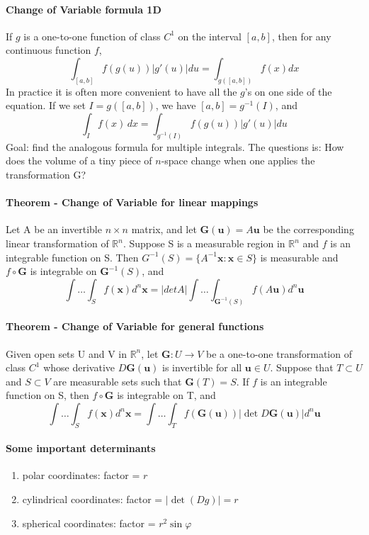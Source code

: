 \documentclass[11pt]{article}
\newcommand{\tb}[1]{\textbf{#1}}
\newcommand{\real}[0]{\mathbb{R}}
\newcommand{\func}[3]{\tb{#1}: {#2} \rightarrow {#3} }
\newcommand{\vx}[0]{\tb{x}}
\begin{document}
\paragraph{Change of Variable formula 1D} If $g$ is a one-to-one function of class $C^1$ on the interval $[a, b]$, then for any continuous function $f$,
$$\int_{[a,b]} f(g(u))|g'(u)|du = \int_{g([a,b])}f(x)dx$$
In practice it is often more convenient to have all the $g$'s on one side of the equation. If we set $I = g([a, b])$, we have $[a, b] = g^{-1}(I)$, and
$$\int_I f(x) \, dx = \int_{g^{-1}(I)}f(g(u))|g'(u)|du$$
Goal: find the analogous formula for multiple integrals. The questions is: How does the volume of a tiny piece of $n$-space change when one applies the transformation G?
\paragraph{Theorem - Change of Variable for linear mappings} Let A be an invertible $n \times n$ matrix, and let $\tb{G}(\tb{u}) = A\tb{u}$ be the corresponding linear transformation of $\real^n$. Suppose S is a measurable region in $\real^n$ and $f$ is an integrable function on S. Then $G^{-1}(S) = \{A^{-1}\tb{x}: \tb{x} \in S\}$ is measurable and $f \circ \tb{G}$ is integrable on $\tb{G}^{-1}(S)$, and
    $$ \int \hdots \int_S f(\vx)d^n\vx = |det A| \int \hdots \int_{\tb{G}^{-1}(S)}f(A\tb{u})d^n\tb{u}$$

\paragraph{Theorem - Change of Variable for general functions} Given open sets U and V in $\real^n$, let $\func{G}{U}{V}$ be a one-to-one transformation of class $C^1$ whose derivative $D\tb{G}(\tb{u})$ is invertible for all $\tb{u} \in U$. Suppose that $T \subset U$ and $S \subset V$ are measurable sets such that $\tb{G}(T) = S$. If $f$ is an integrable function on S, then $f \circ \tb{G}$ is integrable on T, and 
    $$ \int \hdots \int_S f(\vx)d^n\vx = \int \hdots \int_{T}f(\tb{G}(\tb{u}))|\det D\tb{G}(\tb{u})|d^n\tb{u}$$
    
\paragraph{Some important determinants}
\begin{enumerate}
    \item polar coordinates: factor = $r$
    \item cylindrical coordinates: factor = $|\det(Dg)| = r$
    \item spherical coordinates: factor = $r^2\sin\varphi$
\end{enumerate}
\end{document}
